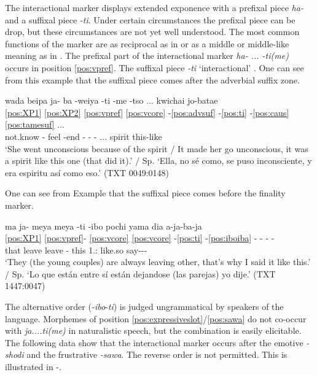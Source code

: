 \documentclass[output=paper,hidelinks]{langscibook}
\begin{document}
\largerpage
The interactional marker displays extended exponence with a prefixal piece \textit{ha-} and a suffixal piece \textit{-ti}. Under certain circumstances the prefixal piece can be drop, but these circumstances are not yet well understood. The most common functions of the marker are as reciprocal as in  or as a middle or middle-like meaning as in . The prefixal part of the interactional marker \textit{ha- ... -ti(me)} occurs in position \ref{pos:vpref}. The suffixal piece \textit{-ti} `interactional' . One can see from this example that the suffixal piece comes after the adverbial suffix zone.

\ea \label{ex:weiyatime}
    \glll  wada beipa ja- ba -weiya -ti -me -tso ... kwichai jo-batae \\
        \ref{pos:XP1} \ref{pos:XP2} \ref{pos:vpref} \ref{pos:vcore} -\ref{pos:advsuf} -\ref{pos:ti} -\ref{pos:caus} \ref{pos:tamesuf} ... {} {}  \\
        \Tsg{} not.know \Intrc{}- feel -end -\Intrc{} -\Caus{} -\Prior{} ... spirit this-like    \\
    \glt `She went unconscious because of the spirit / It made her go unconscious, it was a spirit like this one (that did it).' / Sp. `Ella, no sé como, se puso inconsciente, y era espiritu así como eso.'  \hfill (TXT 0049:0148)
\z 

One can see from Example  that the suffixal piece comes before the finality marker.

\ea \label{ex:tibo}
    \glll  ma ja- meya meya -ti -ibo	pochi yama dia a-ja-ba-ja \\
    \ref{pos:XP1} \ref{pos:vpref}- \ref{pos:vcore} \ref{pos:vcore} -\ref{pos:ti} -\ref{pos:iboiba} - - - - \\
    that \Intrc{} leave leave -\Intrc{} \Final{} this 1.\Sg{}:\Erg{} like.so say-\Dur{}-\Vis{}-\Pst{} \\
    \glt `They (the young couples) are always leaving other, that's why I said it like this.' / Sp. `Lo que están entre sí están dejandose (las parejas) yo dije.'  \hfill (TXT 1447:0047)
\z 

The alternative order (\textit{-ibo}-\textit{ti}) is judged ungrammatical by speakers of the language. Morphemes of position \ref{pos:expressiveslot}/\ref{pos:sawa} do not co-occur with \textit{ja....ti(me)} in naturalistic speech, but the combination is easily elicitable. The following data show that the interactional marker occurs after the emotive \textit{-shodi} and the frustrative \textit{-sawa}. The reverse order is not permitted. This is illustrated in -.
\end{document}
